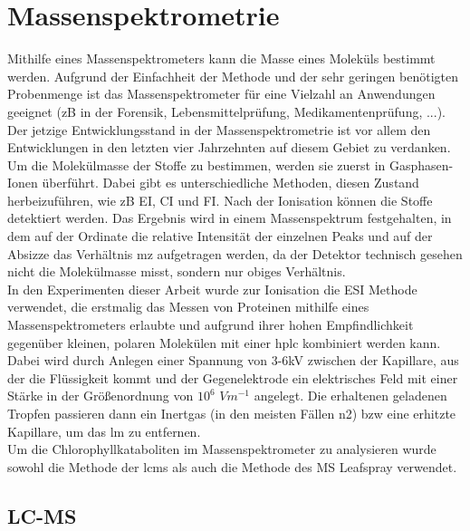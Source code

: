 \section{Massenspektrometrie}

Mithilfe eines Massenspektrometers kann die Masse eines Moleküls bestimmt werden. Aufgrund der Einfachheit der Methode und der sehr geringen benötigten Probenmenge ist das Massenspektrometer für eine Vielzahl an Anwendungen geeignet (\gls{zB} in der Forensik, Lebensmittelprüfung, Medikamentenprüfung, ...). \cite[S. 1]{MassSpectrometry} Der jetzige Entwicklungsstand in der Massenspektrometrie ist vor allem den Entwicklungen in den letzten vier Jahrzehnten auf diesem Gebiet zu verdanken. \cite[S. 6-9]{MassSpectrometry} \\

Um die Molekülmasse der Stoffe zu bestimmen, werden sie zuerst in Gasphasen-Ionen überführt. \cite[S. 15]{MassSpectrometry} Dabei gibt es unterschiedliche Methoden, diesen Zustand herbeizuführen, wie \gls{zB} \gls{EI}, \gls{CI} und \gls{FI}. \cite[S. 15-30]{MassSpectrometry} Nach der Ionisation können die Stoffe detektiert werden. Das Ergebnis wird in einem Massenspektrum festgehalten, in dem auf der Ordinate die relative Intensität der einzelnen Peaks und auf der Absizze das Verhältnis \gls{mz} aufgetragen werden, da der Detektor technisch gesehen nicht die Molekülmasse misst, sondern nur obiges Verhältnis. \\

In den Experimenten dieser Arbeit wurde zur Ionisation die \gls{ESI} Methode verwendet, die erstmalig das Messen von Proteinen mithilfe eines Massenspektrometers erlaubte und aufgrund ihrer hohen Empfindlichkeit gegenüber kleinen, polaren Molekülen mit einer \gls{hplc} kombiniert werden kann. Dabei wird durch Anlegen einer Spannung von 3-6kV zwischen der Kapillare, aus der die Flüssigkeit kommt und der Gegenelektrode ein elektrisches Feld mit einer Stärke in der Größenordnung von $10^{6}$ $Vm^{-1}$ angelegt. Die erhaltenen geladenen Tropfen passieren dann ein Inertgas (in den meisten Fällen \gls{n2}) \gls{bzw} eine erhitzte Kapillare, um das \gls{lm} zu entfernen. \cite[S. 43-44]{MassSpectrometry} \\

Um die Chlorophyllkataboliten im Massenspektrometer zu analysieren wurde sowohl die Methode der \gls{lcms} als auch die Methode des MS Leafspray verwendet. 

\subsection{LC-MS}

